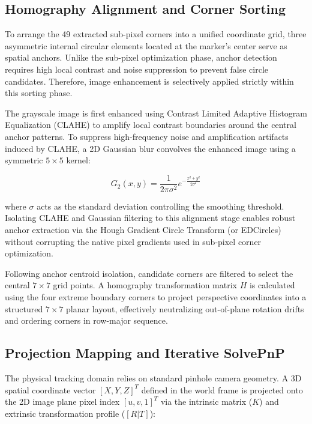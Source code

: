 

\subsection{Homography Alignment and Corner Sorting}
To arrange the 49 extracted sub-pixel corners into a unified coordinate grid, three asymmetric internal circular elements located at the marker's center serve as spatial anchors. Unlike the sub-pixel optimization phase, anchor detection requires high local contrast and noise suppression to prevent false circle candidates. Therefore, image enhancement is selectively applied strictly within this sorting phase.

The grayscale image is first enhanced using Contrast Limited Adaptive Histogram Equalization (CLAHE) to amplify local contrast boundaries around the central anchor patterns. To suppress high-frequency noise and amplification artifacts induced by CLAHE, a 2D Gaussian blur convolves the enhanced image using a symmetric $5 \times 5$ kernel:

\begin{equation}
G_2(x,y) = \frac{1}{2\pi\sigma^2} e^{-\frac{x^2+y^2}{2\sigma^2}}
\end{equation}

where $\sigma$ acts as the standard deviation controlling the smoothing threshold. Isolating CLAHE and Gaussian filtering to this alignment stage enables robust anchor extraction via the Hough Gradient Circle Transform (or EDCircles) without corrupting the native pixel gradients used in sub-pixel corner optimization.

Following anchor centroid isolation, candidate corners are filtered to select the central $7 \times 7$ grid points. A homography transformation matrix $H$ is calculated using the four extreme boundary corners to project perspective coordinates into a structured $7 \times 7$ planar layout, effectively neutralizing out-of-plane rotation drifts and ordering corners in row-major sequence.

\subsection{Projection Mapping and Iterative SolvePnP}
The physical tracking domain relies on standard pinhole camera geometry. A 3D spatial coordinate vector $[X, Y, Z]^T$ defined in the world frame is projected onto the 2D image plane pixel index $[u, v, 1]^T$ via the intrinsic matrix ($K$) and extrinsic transformation profile ($[R|T]$):

